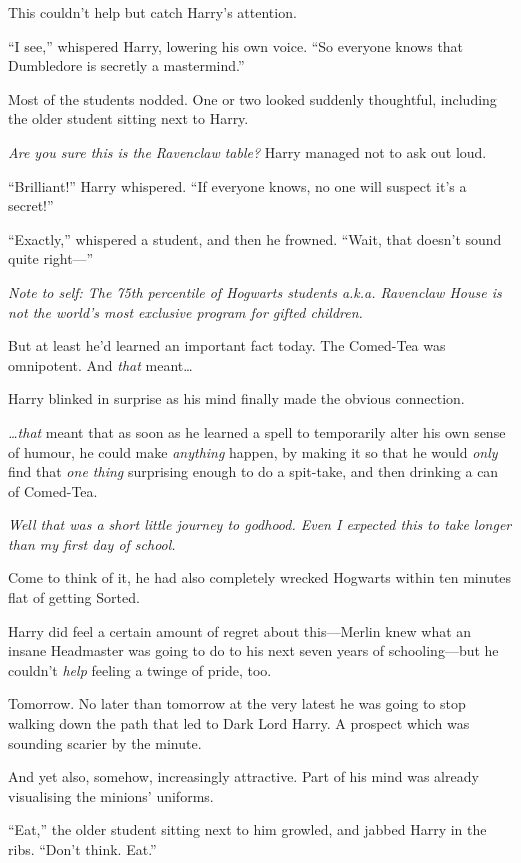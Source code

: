 This couldn't help but catch Harry's attention.

``I see,'' whispered Harry, lowering his own voice. ``So everyone knows
that Dumbledore is secretly a mastermind.''

Most of the students nodded. One or two looked suddenly thoughtful,
including the older student sitting next to Harry.

\emph{Are you sure this is the Ravenclaw table?} Harry managed not to
ask out loud.

``Brilliant!'' Harry whispered. ``If everyone knows, no one will suspect
it's a secret!''

``Exactly,'' whispered a student, and then he frowned. ``Wait, that
doesn't sound quite right---''

\emph{Note to self: The 75th percentile of Hogwarts students a.k.a.
Ravenclaw House is not the world's most exclusive program for gifted
children.}

But at least he'd learned an important fact today. The Comed-Tea was
omnipotent. And \emph{that} meant\ldots{}

Harry blinked in surprise as his mind finally made the obvious
connection.

\emph{\ldots{}that} meant that as soon as he learned a spell to
temporarily alter his own sense of humour, he could make \emph{anything}
happen, by making it so that he would \emph{only} find that \emph{one
thing} surprising enough to do a spit-take, and then drinking a can of
Comed-Tea.

\emph{Well that was a short little journey to godhood. Even I expected
this to take longer than my first day of school.}

Come to think of it, he had also completely wrecked Hogwarts within ten
minutes flat of getting Sorted.

Harry did feel a certain amount of regret about this---Merlin knew what
an insane Headmaster was going to do to his next seven years of
schooling---but he couldn't \emph{help} feeling a twinge of pride, too.

Tomorrow. No later than tomorrow at the very latest he was going to stop
walking down the path that led to Dark Lord Harry. A prospect which was
sounding scarier by the minute.

And yet also, somehow, increasingly attractive. Part of his mind was
already visualising the minions' uniforms.

``Eat,'' the older student sitting next to him growled, and jabbed Harry
in the ribs. ``Don't think. Eat.''

